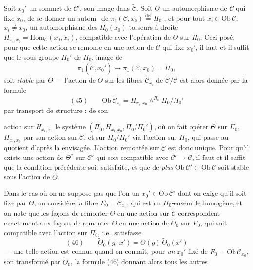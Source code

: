 \documentclass[11pt,a4paper]{article}
\begin{document}
Soit $x_0'$ un sommet de $\mathcal{C}'$,  son image dans $\tilde{\mathcal{C}}$. Soit $\Theta$ un automorphisme de $\mathcal{C}$ qui fixe $x_0$,    de se donner un autom.\ de  $\pi_1(\mathcal{C}, x_0) \overset{\mathrm{def}}{=} \Pi_0$ \struck{\ill{}}, et pour tout  $x_i \in \mathrm{Ob}\,\mathcal{C}$, $x_i \neq x_0$, un automorphisme des $\Pi_0(x_0)$-torseurs à droite $H_{x_i, x_0} = \mathrm{Hom}_{\mathcal{C}}(x_0, x_i)$, compatible avec l'opération de $\Theta$ sur $\Pi_0$. Ceci posé, pour que cette action se remonte en une action de $\tilde{\mathcal{C}}$ qui fixe $x_0'$, il faut et il suffit que le sous-groupe $\Pi_0'$ de $\Pi_0$, image de
\[
  \pi_1(\tilde{\mathcal{C}}, x_0') \hookrightarrow \pi_1(\mathcal{C}, x_0) = \Pi_0,
\]
soit \textit{stable} par $\Theta$ --- l'action de $\Theta$ sur les fibres $\tilde{\mathcal{C}}_{x_i}$ de $\tilde{\mathcal{C}}/\mathcal{C}$ est alors donnée par la formule
\[
  (45) \qquad \mathrm{Ob}\,\tilde{\mathcal{C}}_{x_i} = H_{x_i, x_0} \wedge^{\Pi_0} \Pi_0/\Pi_0'
\]
par transport de structure :  de son

action sur $H_{x_i, x_0}$ le système $(\Pi_0, H_{x_i, x_0}, \Pi_0/\Pi_0')$, où on fait opérer $\Theta$ sur $\Pi_0$, $H_{x_i, x_0}$ par \struck{\ill{}} son action sur $\mathcal{C}$, et sur $\Pi_0/\Pi_0'$ via l'action sur $\Pi_0$, qui passe au quotient d'après la    envisagée. L'action  remontée   sur $\tilde{\mathcal{C}}$ est donc unique. Pour qu'il existe une action de $\Theta^{*}$ sur $\mathcal{C}'$ qui soit compatible avec $\mathcal{C}' \to \mathcal{C}$, il faut et il suffit que la condition précédente soit satisfaite, et que de \textit{plus} $\mathrm{Ob}\,\mathcal{C}' \subset \mathrm{Ob}\,\mathcal{C}$ soit stable sous \struck{\ill{}} l'action de $\tilde{\Theta}$.

Dans le cas où on ne suppose pas que l'on  un $x_0' \in \mathrm{Ob}\,\mathcal{C}'$ dont on exige qu'il soit fixe par $\Theta$,  on considère la fibre $E_0 = \tilde{\mathcal{C}}_{x_0}$, qui est un $\Pi_0$-ensemble \struck{\ill{}} homogène, et on note que les façons de remonter $\Theta$ en une action \struck{\ill{}} \add{$\tilde{\Theta}$} sur $\tilde{\mathcal{C}}$ correspondent \struck{\ill{}} exactement aux façons de remonter $\Theta$ en une action de $\tilde{\Theta}_0$ sur $E_0$, \struck{\ill{}} qui soit compatible avec l'action sur $\Pi_0$, i.e.\ satisfasse
\[
  (46) \qquad \tilde{\Theta}_0(g \cdot x') = \Theta(g)\, \tilde{\Theta}_0(x')
\]
---  une telle action est connue quand on connaît, pour \textit{un} $x_0'$ fixé de $E_0 = \mathrm{Ob}\,\tilde{\mathcal{C}}_{x_0}$, son transformé par $\tilde{\Theta}_0$, la formule (46) \struck{\ill{}}  donnant alors tous les autres
\end{document}
